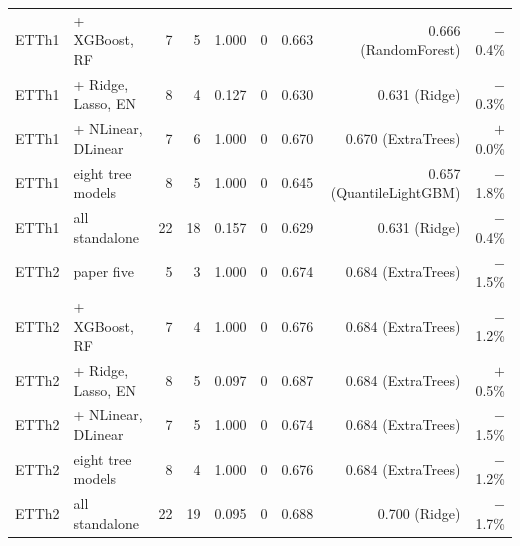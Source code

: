 \begin{tabular}{llrrrrrrr}
ETTh1 & + XGBoost, RF & 7 & 5 & 1.000 & 0 & 0.663 & 0.666 (RandomForest) & $-$0.4\% \\
ETTh1 & + Ridge, Lasso, EN & 8 & 4 & 0.127 & 0 & 0.630 & 0.631 (Ridge) & $-$0.3\% \\
ETTh1 & + NLinear, DLinear & 7 & 6 & 1.000 & 0 & 0.670 & 0.670 (ExtraTrees) & $+$0.0\% \\
ETTh1 & eight tree models & 8 & 5 & 1.000 & 0 & 0.645 & 0.657 (QuantileLightGBM) & $-$1.8\% \\
ETTh1 & all standalone & 22 & 18 & 0.157 & 0 & 0.629 & 0.631 (Ridge) & $-$0.4\% \\
ETTh2 & paper five & 5 & 3 & 1.000 & 0 & 0.674 & 0.684 (ExtraTrees) & $-$1.5\% \\
ETTh2 & + XGBoost, RF & 7 & 4 & 1.000 & 0 & 0.676 & 0.684 (ExtraTrees) & $-$1.2\% \\
ETTh2 & + Ridge, Lasso, EN & 8 & 5 & 0.097 & 0 & 0.687 & 0.684 (ExtraTrees) & $+$0.5\% \\
ETTh2 & + NLinear, DLinear & 7 & 5 & 1.000 & 0 & 0.674 & 0.684 (ExtraTrees) & $-$1.5\% \\
ETTh2 & eight tree models & 8 & 4 & 1.000 & 0 & 0.676 & 0.684 (ExtraTrees) & $-$1.2\% \\
ETTh2 & all standalone & 22 & 19 & 0.095 & 0 & 0.688 & 0.700 (Ridge) & $-$1.7\% \\
\bottomrule
\end{tabular}
